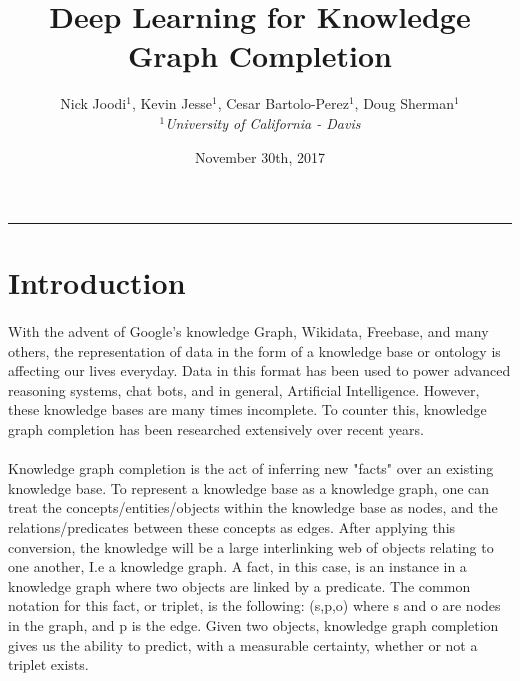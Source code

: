 \documentclass[11.5pt]{article}
\begin{document}
\title{Deep Learning for Knowledge Graph Completion}
\author{Nick Joodi$^1$, Kevin Jesse$^1$, Cesar Bartolo-Perez$^1$, Doug Sherman$^1$\\
	{\small
	\textit{$^1$University of California - Davis}}
} 
\date{November 30th, 2017}
\maketitle
\rule{\textwidth}{1pt}

\begin{abstract}

\end{abstract}

\tableofcontents

\section{Introduction}

\paragraph{} With the advent of Google's knowledge Graph, Wikidata, Freebase, and many others, the representation of data in the form of a knowledge base or ontology is affecting our lives everyday. Data in this format has been used to power advanced reasoning systems, chat bots, and in general, Artificial Intelligence. However, these knowledge bases are many times incomplete. To counter this, knowledge graph completion has been researched extensively over recent years. 

\paragraph{} Knowledge graph completion is the act of inferring new "facts" over an existing knowledge base. To represent a knowledge base as a knowledge graph, one can treat the concepts/entities/objects within the knowledge base as nodes, and the relations/predicates between these concepts as edges. After applying this conversion, the knowledge will be a large interlinking web of objects relating to one another, I.e a knowledge graph. A fact, in this case, is an instance in a knowledge graph where two objects are linked by a predicate. The common notation for this fact, or triplet, is the following:  (s,p,o) where s and o are nodes in the graph, and p is the edge. Given two objects, knowledge graph completion gives us the ability to predict, with a measurable certainty, whether or not a triplet exists.
\end{document}
